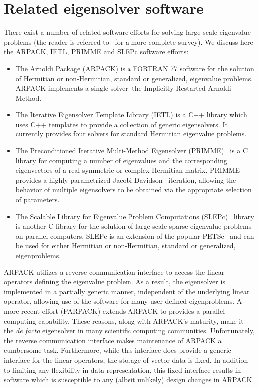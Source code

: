 \documentclass[acmtoms]{acmtrans2m}
\begin{document}
\section{Related eigensolver software}
\label{sec:related-software}

There exist a number of related software efforts for solving large-scale eigenvalue problems (the
reader is referred to~\cite{slepc:05} for a more complete survey). We discuss here the
ARPACK, IETL, PRIMME and SLEPc software efforts:
\begin{itemize}
  \item 
    The Arnoldi Package (ARPACK) is a FORTRAN 77 software for the solution of Hermitian or
    non-Hermitian, standard or generalized, eigenvalue problems. ARPACK implements a single
    solver, the Implicitly Restarted Arnoldi Method.
  \item 
    The Iterative Eigensolver Template Library (IETL) is a C++ library which uses C++
    templates to provide a collection of generic eigensolvers. It currently provides four
    solvers for standard Hermitian eigenvalue problems.
  \item
    The Preconditioned Iterative Multi-Method Eigensolver (PRIMME)~\cite{primme:06} is a C
    library for computing a number of eigenvalues and the corresponding eigenvectors of a real
    symmetric or complex Hermitian matrix. PRIMME provides a highly parametrized
    Jacobi-Davidson~\cite{slvo:96} iteration, allowing the behavior of multiple eigensolvers
    to be obtained via the appropriate selection of parameters.
  \item
    The Scalable Library for Eigenvalue Problem Computations (SLEPc)~\cite{slepc:06} library
    is another C library for the solution of large scale sparse eigenvalue problems on parallel
    computers. SLEPc is an extension of the popular PETSc~\cite{petsc-web-page} and can be
    used for either Hermitian or non-Hermitian, standard or generalized, eigenproblems.
\end{itemize}

ARPACK utilizes a reverse-communication interface to access the linear operators defining
the eigenvalue problem. As a result, the eigensolver is implemented in a partially generic
manner, independent of the underlying linear operator, allowing use of the software for
many user-defined eigenproblems. A more recent effort (PARPACK) extends ARPACK to provides
a parallel computing capability. These reasons, along with ARPACK's maturity, make it the
\textit{de facto} eigensolver in many scientific computing communities. Unfortunately, the
reverse communication interface makes maintenance of ARPACK a cumbersome task.
Furthermore, while this interface does provide a generic interface for the linear
operators, the storage of vector data is fixed. In addition to limiting any flexibility in
data representation, this fixed interface results in software which is susceptible to any
(albeit unlikely) design changes in ARPACK.
\end{document}
